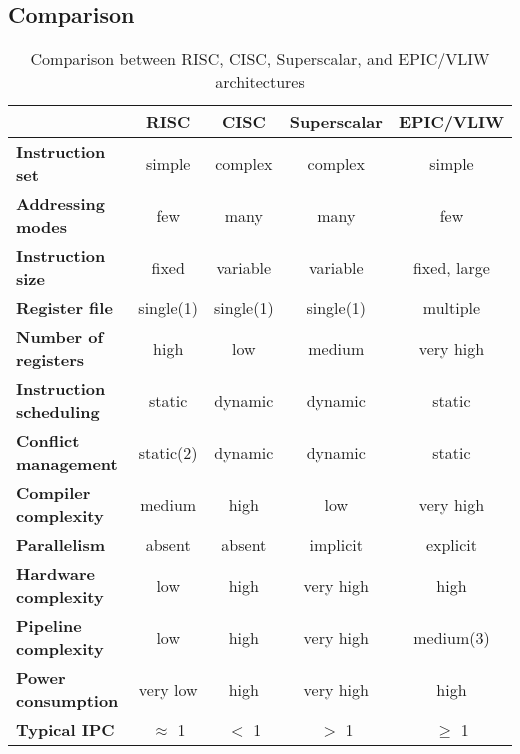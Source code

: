 \subsection{Comparison}
\begin{table}[H]
    \centering
    \begin{tabular}{|l|c|c|c|c|}
    \hline
    & \textbf{RISC} & \textbf{CISC} & \textbf{Superscalar} & \textbf{EPIC/VLIW} \\ 
    \hline
    \textbf{Instruction set} & simple & complex & complex & simple \\ 
    \hline
    \textbf{Addressing modes} & few & many & many & few \\ 
    \hline
    \textbf{Instruction size} & fixed & variable & variable & fixed, large \\ 
    \hline
    \textbf{Register file} & single(1) & single(1) & single(1) & multiple \\ 
    \hline
    \textbf{Number of registers} & high & low & medium & very high \\ 
    \hline
    \textbf{Instruction scheduling} & static & dynamic & dynamic & static \\ 
    \hline
    \textbf{Conflict management} & static(2) & dynamic & dynamic & static \\ 
    \hline
    \textbf{Compiler complexity} & medium & high & low & very high \\ 
    \hline
    \textbf{Parallelism} & absent & absent & implicit & explicit \\ 
    \hline
    \textbf{Hardware complexity} & low & high & very high & high \\ 
    \hline
    \textbf{Pipeline complexity} & low & high & very high & medium(3) \\ 
    \hline
    \textbf{Power consumption} & very low & high & very high & high \\ 
    \hline
    \textbf{Typical IPC} & $\approx$ 1 & $<$ 1 & $>$ 1 & $\geq$ 1 \\ 
    \hline
    \end{tabular}
    \caption{Comparison between RISC, CISC, Superscalar, and EPIC/VLIW architectures}
\end{table}
    